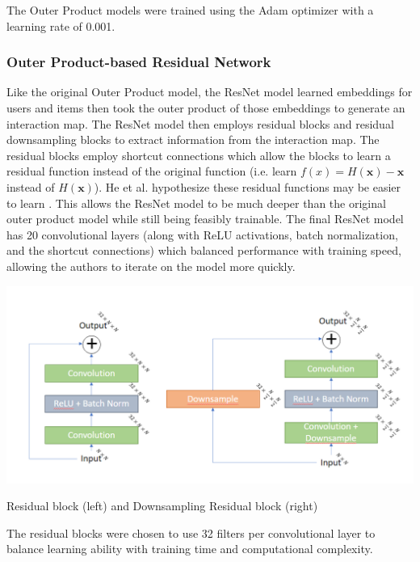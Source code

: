\documentclass{article}
\begin{document}
The Outer Product models were trained using the Adam optimizer with a learning rate of 0.001.

\subsubsection{Outer Product-based Residual Network}
Like the original Outer Product model, the ResNet model learned embeddings for users and items then took the outer product of those embeddings to generate an interaction map. The ResNet model then employs residual blocks and residual downsampling blocks to extract information from the interaction map. The residual blocks employ shortcut connections which allow the blocks to learn a residual function instead of the original function (i.e. learn $f(x) = H(\mathbf{x}) - \mathbf{x}$ instead of $H(\mathbf{x})$). He et al. hypothesize these residual functions may be easier to learn \cite{he2015deep}. This allows the ResNet model to be much deeper than the original outer product model while still being feasibly trainable. The final ResNet model has 20 convolutional layers (along with ReLU activations, batch normalization, and the shortcut connections) which balanced performance with training speed, allowing the authors to iterate on the model more quickly.

\begin{center}
\includegraphics[scale=0.4]{ResBlocks_Diagram}

Residual block (left) and Downsampling Residual block (right)
\end{center}

The residual blocks were chosen to use 32 filters per convolutional layer to balance learning ability with training time and computational complexity.
\end{document}
